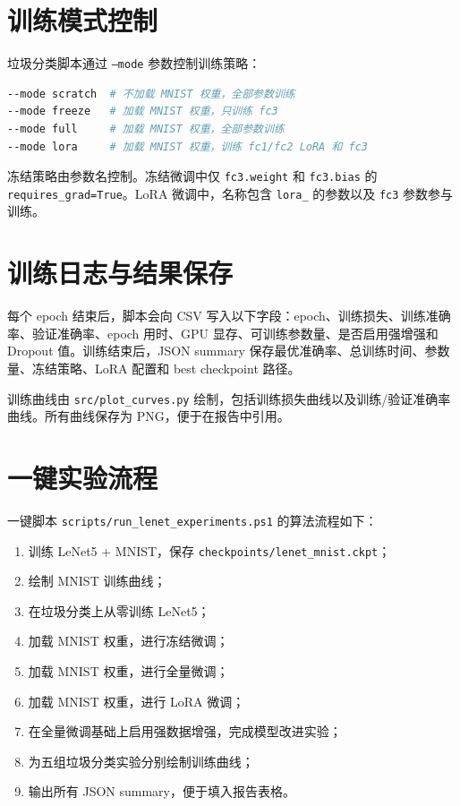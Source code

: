 \section{训练模式控制}

垃圾分类脚本通过 \texttt{--mode} 参数控制训练策略：

\begin{lstlisting}[language=bash,numbers=none]
--mode scratch  # 不加载 MNIST 权重，全部参数训练
--mode freeze   # 加载 MNIST 权重，只训练 fc3
--mode full     # 加载 MNIST 权重，全部参数训练
--mode lora     # 加载 MNIST 权重，训练 fc1/fc2 LoRA 和 fc3
\end{lstlisting}

冻结策略由参数名控制。冻结微调中仅 \texttt{fc3.weight} 和 \texttt{fc3.bias} 的 \texttt{requires\_grad=True}。LoRA 微调中，名称包含 \texttt{lora\_} 的参数以及 \texttt{fc3} 参数参与训练。

\section{训练日志与结果保存}

每个 epoch 结束后，脚本会向 CSV 写入以下字段：epoch、训练损失、训练准确率、验证准确率、epoch 用时、GPU 显存、可训练参数量、是否启用强增强和 Dropout 值。训练结束后，JSON summary 保存最优准确率、总训练时间、参数量、冻结策略、LoRA 配置和 best checkpoint 路径。

训练曲线由 \texttt{src/plot\_curves.py} 绘制，包括训练损失曲线以及训练/验证准确率曲线。所有曲线保存为 PNG，便于在报告中引用。

\section{一键实验流程}

一键脚本 \texttt{scripts/run\_lenet\_experiments.ps1} 的算法流程如下：

\begin{enumerate}[label=(\arabic*)]
  \item 训练 LeNet5 + MNIST，保存 \texttt{checkpoints/lenet\_mnist.ckpt}；
  \item 绘制 MNIST 训练曲线；
  \item 在垃圾分类上从零训练 LeNet5；
  \item 加载 MNIST 权重，进行冻结微调；
  \item 加载 MNIST 权重，进行全量微调；
  \item 加载 MNIST 权重，进行 LoRA 微调；
  \item 在全量微调基础上启用强数据增强，完成模型改进实验；
  \item 为五组垃圾分类实验分别绘制训练曲线；
  \item 输出所有 JSON summary，便于填入报告表格。
\end{enumerate}
